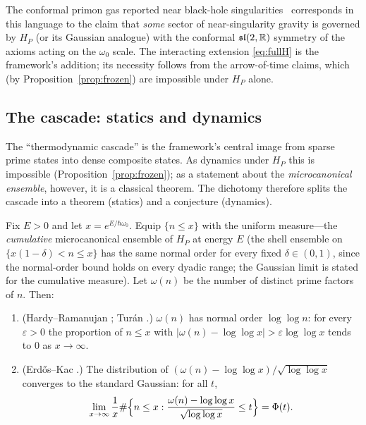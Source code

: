 \begin{remark}
The conformal primon gas reported near black-hole singularities~\cite{hartnollyang2026}
corresponds in this language to the claim that \emph{some} sector of
near-singularity gravity is governed by $H_{P}$ (or its Gaussian analogue) with the conformal
$\mathfrak{sl}(2,\mathbb{R})$ symmetry of the axioms acting on the $\omega_{0}$ scale.
The interacting extension \eqref{eq:fullH} is the framework's addition; its necessity
follows from the arrow-of-time claims, which (by
Proposition~\ref{prop:frozen}) are impossible under $H_{P}$ alone.
\end{remark}

\subsection{The cascade: statics and dynamics}

The ``thermodynamic cascade'' is the framework's central image from sparse prime
states into dense composite states. As dynamics under $H_{P}$ this is impossible
(Proposition~\ref{prop:frozen}); as a statement about the \emph{microcanonical ensemble},
however, it is a classical theorem. The dichotomy therefore splits the cascade into a theorem
(statics) and a conjecture (dynamics).

\begin{theorem}\label{thm:erdoskac}
Fix $E>0$ and let $x=e^{E/\hbar\omega_{0}}$. Equip
$\{n\leq x\}$ with the uniform measure---the \emph{cumulative} microcanonical ensemble of
$H_{P}$ at energy $E$ (the shell ensemble on $\{x(1-\delta)<n\leq x\}$ has the same normal
order for every fixed $\delta\in(0,1)$, since the normal-order bound holds on every dyadic
range; the Gaussian limit is stated for the cumulative measure). Let $\omega(n)$ be the
number of distinct prime factors of $n$. Then:
\begin{enumerate}[leftmargin=1.6em]
\item (Hardy--Ramanujan \cite{hardyramanujan1917}; Tur{\'a}n \cite{turan1934}.)
$\omega(n)$ has normal order $\log\log n$: for every $\varepsilon>0$ the proportion of
$n\leq x$ with $|\omega(n)-\log\log x|>\varepsilon\log\log x$ tends to $0$ as $x\to\infty$.
\item (Erd\H{o}s--Kac \cite{erdoskac1940}.) The distribution of
$(\omega(n)-\log\log x)/\sqrt{\log\log x}$ converges to the standard Gaussian: for all $t$,
\begin{equation}
\lim_{x\to\infty}\frac{1}{x}\#\Bigl\{n\leq x:
\frac{\omega(n)-\log\log x}{\sqrt{\log\log x}}\leq t\Bigr\}=\Phi(t).
\end{equation}
\end{enumerate}
\end{theorem}

